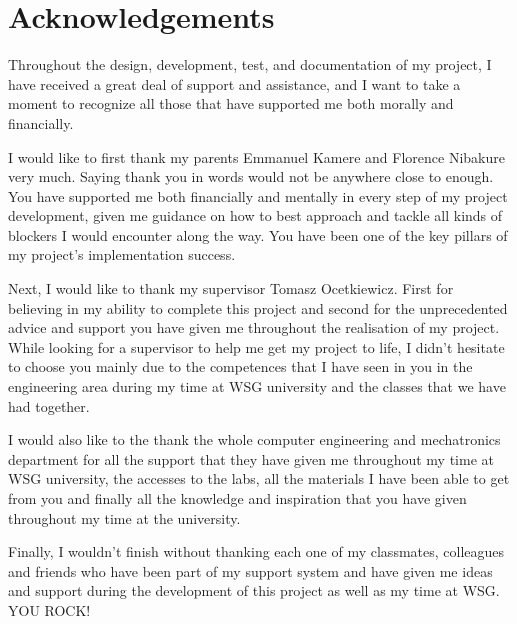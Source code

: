\cleardoublepage

\section*{\centering \Large Acknowledgements}

\begin{acknowledgements}

    Throughout the design, development, test, and documentation of my project, I have received a great deal of support and assistance, and I want to take a moment to recognize all those that have supported me both morally and financially.

    I would like to first thank my parents Emmanuel Kamere and Florence Nibakure very much. Saying thank you in words would not be anywhere close to enough. You have supported me both financially and mentally in every step of my project development, given me guidance on how to best approach and tackle all kinds of blockers I would encounter along the way. You have been one of the key pillars of my project’s implementation success.

    Next, I would like to thank my supervisor Tomasz Ocetkiewicz. First for believing in my ability to complete this project and second for the unprecedented advice and support you have given me throughout the realisation of my project. While looking for a supervisor to help me get my project to life, I didn’t hesitate to choose you mainly due to the competences that I have seen in you in the engineering area during my time at WSG university and the classes that we have had together.

    I would also like to the thank the whole computer engineering and mechatronics department for all the support that they have given me throughout my time at WSG university, the accesses to the labs, all the materials I have been able to get from you and finally all the knowledge and inspiration that you have given throughout my time at the university.

    Finally, I wouldn’t finish without thanking each one of my classmates, colleagues and friends who have been part of my support system and have given me ideas and support during the development of this project as well as my time at WSG. YOU ROCK!

\end{acknowledgements}

